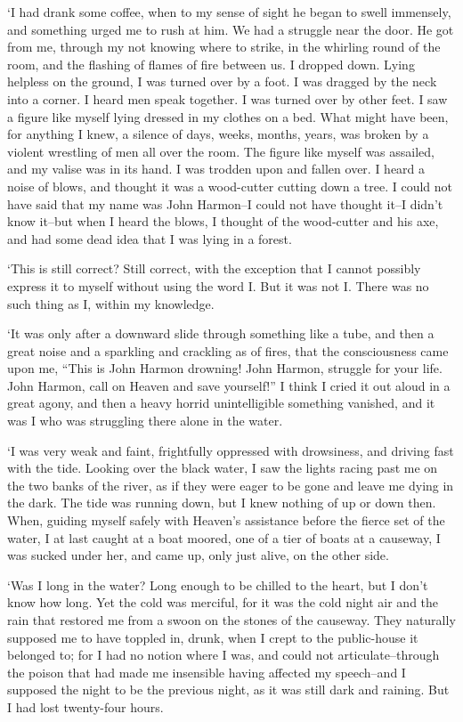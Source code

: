 ‘I had drank some coffee, when to my sense of sight he began to swell
immensely, and something urged me to rush at him. We had a struggle near
the door. He got from me, through my not knowing where to strike, in the
whirling round of the room, and the flashing of flames of fire between
us. I dropped down. Lying helpless on the ground, I was turned over by
a foot. I was dragged by the neck into a corner. I heard men speak
together. I was turned over by other feet. I saw a figure like myself
lying dressed in my clothes on a bed. What might have been, for anything
I knew, a silence of days, weeks, months, years, was broken by a violent
wrestling of men all over the room. The figure like myself was assailed,
and my valise was in its hand. I was trodden upon and fallen over. I
heard a noise of blows, and thought it was a wood-cutter cutting down
a tree. I could not have said that my name was John Harmon--I could not
have thought it--I didn’t know it--but when I heard the blows, I thought
of the wood-cutter and his axe, and had some dead idea that I was lying
in a forest.

‘This is still correct? Still correct, with the exception that I cannot
possibly express it to myself without using the word I. But it was not
I. There was no such thing as I, within my knowledge.

‘It was only after a downward slide through something like a tube, and
then a great noise and a sparkling and crackling as of fires, that the
consciousness came upon me, “This is John Harmon drowning! John Harmon,
struggle for your life. John Harmon, call on Heaven and save yourself!”
 I think I cried it out aloud in a great agony, and then a heavy horrid
unintelligible something vanished, and it was I who was struggling there
alone in the water.

‘I was very weak and faint, frightfully oppressed with drowsiness, and
driving fast with the tide. Looking over the black water, I saw the
lights racing past me on the two banks of the river, as if they were
eager to be gone and leave me dying in the dark. The tide was running
down, but I knew nothing of up or down then. When, guiding myself safely
with Heaven’s assistance before the fierce set of the water, I at last
caught at a boat moored, one of a tier of boats at a causeway, I was
sucked under her, and came up, only just alive, on the other side.

‘Was I long in the water? Long enough to be chilled to the heart, but
I don’t know how long. Yet the cold was merciful, for it was the cold
night air and the rain that restored me from a swoon on the stones of
the causeway. They naturally supposed me to have toppled in, drunk, when
I crept to the public-house it belonged to; for I had no notion where
I was, and could not articulate--through the poison that had made me
insensible having affected my speech--and I supposed the night to be
the previous night, as it was still dark and raining. But I had lost
twenty-four hours.


